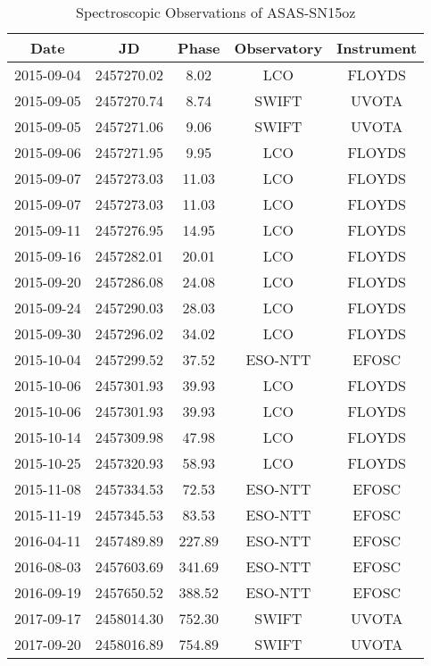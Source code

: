 \begin{table}
\centering
\caption{Spectroscopic Observations of ASAS-SN15oz}
\begin{tabular}{ccccc}
Date & JD & Phase & Observatory & Instrument \\
\hline
2015-09-04 & 2457270.02 & 8.02 & LCO & FLOYDS \\
2015-09-05 & 2457270.74 & 8.74 & SWIFT & UVOTA \\
2015-09-05 & 2457271.06 & 9.06 & SWIFT & UVOTA \\
2015-09-06 & 2457271.95 & 9.95 & LCO & FLOYDS \\
2015-09-07 & 2457273.03 & 11.03 & LCO & FLOYDS \\
2015-09-07 & 2457273.03 & 11.03 & LCO & FLOYDS \\
2015-09-11 & 2457276.95 & 14.95 & LCO & FLOYDS \\
2015-09-16 & 2457282.01 & 20.01 & LCO & FLOYDS \\
2015-09-20 & 2457286.08 & 24.08 & LCO & FLOYDS \\
2015-09-24 & 2457290.03 & 28.03 & LCO & FLOYDS \\
2015-09-30 & 2457296.02 & 34.02 & LCO & FLOYDS \\
2015-10-04 & 2457299.52 & 37.52 & ESO-NTT & EFOSC \\
2015-10-06 & 2457301.93 & 39.93 & LCO & FLOYDS \\
2015-10-06 & 2457301.93 & 39.93 & LCO & FLOYDS \\
2015-10-14 & 2457309.98 & 47.98 & LCO & FLOYDS \\
2015-10-25 & 2457320.93 & 58.93 & LCO & FLOYDS \\
2015-11-08 & 2457334.53 & 72.53 & ESO-NTT & EFOSC \\
2015-11-19 & 2457345.53 & 83.53 & ESO-NTT & EFOSC \\
2016-04-11 & 2457489.89 & 227.89 & ESO-NTT & EFOSC \\
2016-08-03 & 2457603.69 & 341.69 & ESO-NTT & EFOSC \\
2016-09-19 & 2457650.52 & 388.52 & ESO-NTT & EFOSC \\
2017-09-17 & 2458014.30 & 752.30 & SWIFT & UVOTA \\
2017-09-20 & 2458016.89 & 754.89 & SWIFT & UVOTA \\
\end{tabular}
\end{table}
